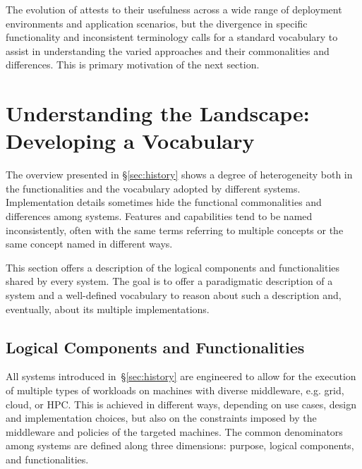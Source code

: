 \documentclass{sig-alternate}
\begin{document}
The evolution of \pilots attests to their usefulness across a wide range of
deployment environments and application scenarios, but the divergence in
specific functionality and inconsistent terminology calls for a standard
vocabulary to assist in understanding the varied approaches and their
commonalities and differences. This is primary motivation of the next section.



\newcommand{\vocab}[1]{\textbf{#1}\xspace}
\newcommand{\prop}[1]{\textit{#1}\xspace}
\newcommand{\impterm}[1]{\texttt{#1}\xspace}

\section{Understanding the Landscape: Developing a Vocabulary}
\label{sec:understanding}

The overview presented in \S\ref{sec:history} shows a degree of heterogeneity
both in the functionalities and the vocabulary adopted by different \pilotjob
systems. Implementation details sometimes hide the functional commonalities and
differences among \pilotjob systems. Features and capabilities tend to be named
inconsistently, often with the same terms referring to multiple concepts or the
same concept named in different ways.

This section offers a description of the logical components and functionalities
shared by every \pilotjob system. The goal is to offer a paradigmatic
description of a \pilotjob system and a well-defined vocabulary to reason about
such a description and, eventually, about its multiple implementations.


\subsection{Logical Components and Functionalities}
\label{sec:compsandfuncs}

All \pilotjob systems introduced in~\S\ref{sec:history} are engineered to allow
for the execution of multiple types of workloads on machines with diverse
middleware, e.g. grid, cloud, or HPC. This is achieved in different ways,
depending on use cases, design and implementation choices, but also on the
constraints imposed by the middleware and policies of the targeted machines. The
common denominators among \pilotjob systems are defined along three dimensions:
purpose, logical components, and functionalities.
\end{document}
